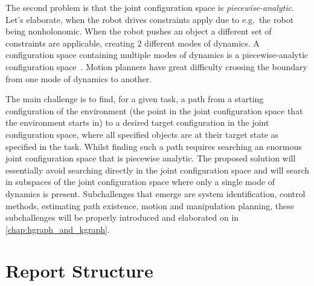 The second problem is that the joint configuration space is \textit{piecewise-analytic}. Let's elaborate, when the robot drives constraints apply due to e.g.~the robot being nonholonomic. When the robot pushes an object a different set of constraints are applicable, creating 2 different modes of dynamics. A configuration space containing multiple modes of dynamics is a piecewise-analytic configuration space~\cite{vega-brown_asymptotically_2020}. Motion planners have great difficulty crossing the boundary from one mode of dynamics to another.\bs

The main challenge is to find, for a given task, a path from a starting configuration of the environment (the point in the joint configuration space that the environment starts in) to a desired target configuration in the joint configuration space, where all specified objects are at their target state as specified in the task. Whilst finding such a path requires searching an enormous joint configuration space that is piecewise analytic. The proposed solution will essentially avoid searching directly in the joint configuration space and will search in subspaces of the joint configuration space where only a single mode of dynamics is present. Subchallenges that emerge are system identification, control methods, estimating path existence, motion and manipulation planning, these subchallenges will be properly introduced and elaborated on in \cref{chap:hgraph_and_kgraph}.\bs

\section{Report Structure}%
\label{sec:report_structure}



